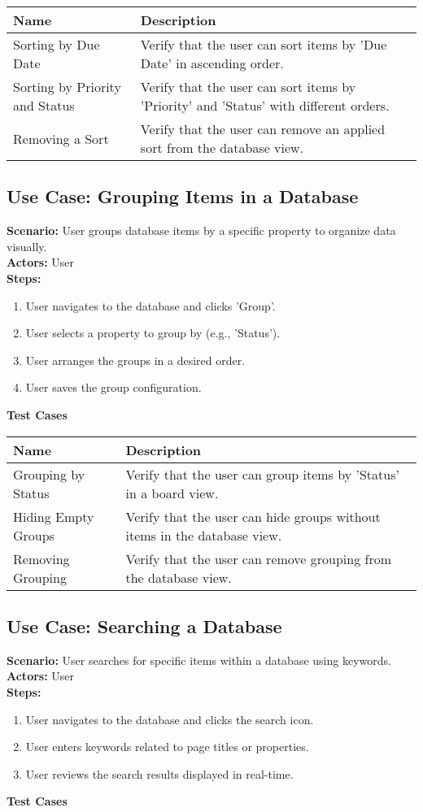 \documentclass{article}
\begin{document}
            \begin{longtable}{|p{}|p{}|}
            \hline
            \textbf{Name} & \textbf{Description} \\
            \hline
            Sorting by Due Date & Verify that the user can sort items by 'Due Date' in ascending order. \\
\hline
Sorting by Priority and Status & Verify that the user can sort items by 'Priority' and 'Status' with different orders. \\
\hline
Removing a Sort & Verify that the user can remove an applied sort from the database view. \\
\hline
\end{longtable}\subsection{\textbf{Use Case: Grouping Items in a Database}}
\textbf{Scenario:} User groups database items by a specific property to organize data visually.\\
\textbf{Actors:} User\\
\textbf{Steps:}
\begin{enumerate}
\item User navigates to the database and clicks 'Group'.
\item User selects a property to group by (e.g., 'Status').
\item User arranges the groups in a desired order.
\item User saves the group configuration.
\end{enumerate}
\textbf{Test Cases}

            \begin{longtable}{|p{}|p{}|}
            \hline
            \textbf{Name} & \textbf{Description} \\
            \hline
            Grouping by Status & Verify that the user can group items by 'Status' in a board view. \\
\hline
Hiding Empty Groups & Verify that the user can hide groups without items in the database view. \\
\hline
Removing Grouping & Verify that the user can remove grouping from the database view. \\
\hline
\end{longtable}\subsection{\textbf{Use Case: Searching a Database}}
\textbf{Scenario:} User searches for specific items within a database using keywords.\\
\textbf{Actors:} User\\
\textbf{Steps:}
\begin{enumerate}
\item User navigates to the database and clicks the search icon.
\item User enters keywords related to page titles or properties.
\item User reviews the search results displayed in real-time.
\end{enumerate}
\textbf{Test Cases}
\end{document}

